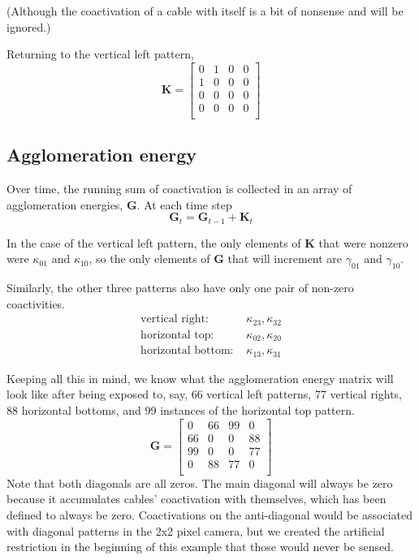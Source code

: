(Although the coactivation of a cable with itself is a bit of nonsense
and will be ignored.)

Returning to the vertical left pattern,
\begin{equation}
\mathbf{K} = 
\begin{bmatrix}
  0 & 1 & 0 & 0 \\
  1 & 0 & 0 & 0 \\
  0 & 0 & 0 & 0 \\
  0 & 0 & 0 & 0 \\
\end{bmatrix}
\end{equation}

\subsection{Agglomeration energy}
\label{subsec:algoaggenergy}

Over time, the running sum of coactivation is collected in an array
of agglomeration energies, $\mathbf{G}$. At each time step
\begin{equation}
\mathbf{G}_{t} = \mathbf{G}_{t - 1} + \mathbf{K}_{t}
\end{equation}

In the case of the vertical left pattern, the only elements
of $\mathbf{K}$ that were nonzero were $\kappa_{01}$ and
$\kappa_{10}$, so the only elements of $\mathbf{G}$ that will
increment are $\gamma_{01}$ and $\gamma_{10}$.

Similarly, the other three patterns also have only one pair
of non-zero coactivities.
\begin{eqnarray*}
\mbox{vertical right:  }&\kappa_{23}, \kappa_{32}\\
\mbox{horizontal top:  }&\kappa_{02}, \kappa_{20}\\
\mbox{horizontal bottom:  }&\kappa_{13}, \kappa_{31}
\end{eqnarray*}

Keeping all this in mind, we know what the agglomeration energy matrix
will look like after being exposed to, say, 66 vertical left patterns,
77 vertical rights, 88 horizontal bottoms, and 99 instances of the
horizontal top pattern.
\begin{equation}
\mathbf{G} = 
\begin{bmatrix}
  0 & 66 & 99 & 0 \\
  66 & 0 & 0 & 88 \\
  99 & 0 & 0 & 77 \\
  0 & 88 & 77 & 0 \\
\end{bmatrix}
\end{equation}
Note that both diagonals are all zeros. The main diagonal will always
be zero because it accumulates cables' coactivation with themselves,
which has been defined to always be zero. Coactivations on the
anti-diagonal would be associated with diagonal patterns in the 2x2
pixel camera, but we created the artificial restriction in the
beginning of this example that those would never be sensed.

